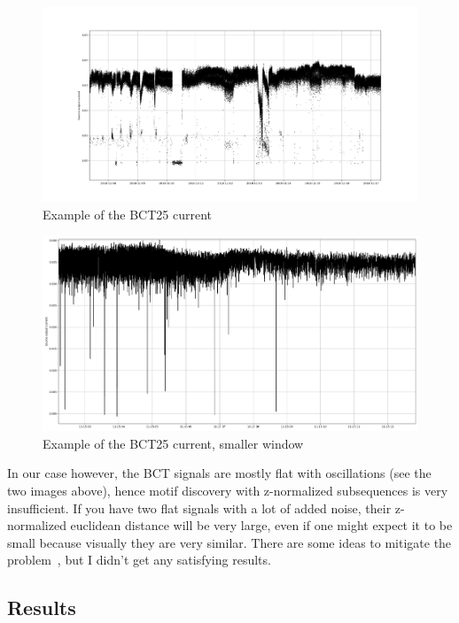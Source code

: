 \documentclass[12pt,a4paper]{article}
\begin{document}
\begin{figure}
\centering
\includegraphics{images/current_demo.png}
\caption{Example of the BCT25 current}
\end{figure}

\begin{figure}
\centering
\includegraphics{images/current_demo_2.png}
\caption{Example of the BCT25 current, smaller window}
\end{figure}

In our case however, the BCT signals are mostly flat with oscillations
(see the two images above), hence motif discovery with z-normalized
subsequences is very insufficient. If you have two flat signals with a
lot of added noise, their z-normalized euclidean distance will be very
large, even if one might expect it to be small because visually they are
very similar. There are some ideas to mitigate the problem~\cite{Paepe:EliminatingNoiseMatrix}, 
but I didn't get any satisfying results.

\hypertarget{results}{%
\subsection{Results}\label{results}}
\end{document}
